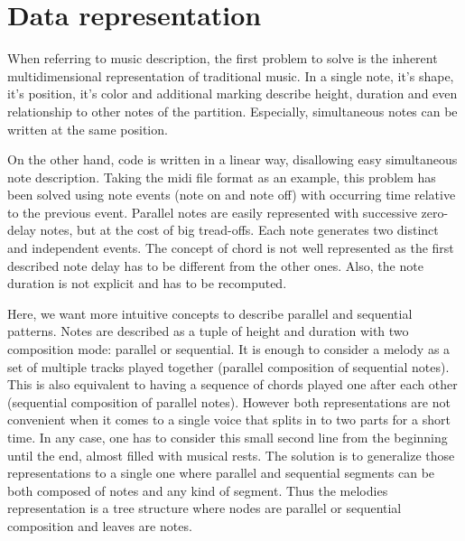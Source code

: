 \documentclass[twocolumn, 11pt]{article}
\begin{document}

\section{Data representation}

When referring to music description, the first problem to solve is the inherent multidimensional representation of traditional music. In a single note, it's shape, it's position, it's color and additional marking describe height, duration and even relationship to other notes of the partition.
Especially, simultaneous notes can be written at the same position.

On the other hand, code is written in a linear way, disallowing easy simultaneous note description.
Taking the midi file format as an example, this problem has been solved using note events (note on and note off) with occurring time relative to the previous event.
Parallel notes are easily represented with successive zero-delay notes, but at the cost of big tread-offs. Each note generates two distinct and independent events. The concept of chord is not well represented as the first described note delay has to be different from the other ones.
Also, the note duration is not explicit and has to be recomputed.

Here, we want more intuitive concepts to describe parallel and sequential patterns. Notes are described as a tuple of height and duration with two composition mode: parallel or sequential.
It is enough to consider a melody as a set of multiple tracks played together (parallel composition of sequential notes).
This is also equivalent to having a sequence of chords played one after each other (sequential composition of parallel notes).
However both representations are not convenient when it comes to a single voice that splits in to two parts for a short time.
In any case, one has to consider this small second line from the beginning until the end, almost filled with musical rests.
The solution is to generalize those representations to a single one where parallel and sequential segments can be both composed of notes and any kind of segment.
Thus the melodies representation is a tree structure where nodes are parallel or sequential composition and leaves are notes.
\end{document}
